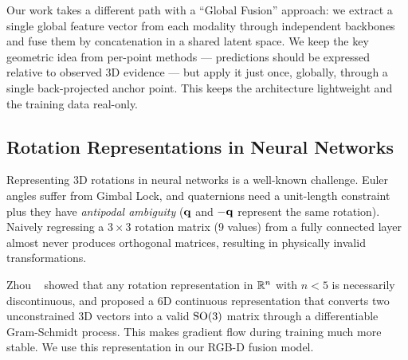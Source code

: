 Our work takes a different path with a ``Global Fusion'' approach: we extract a single global feature vector from each modality through independent backbones and fuse them by concatenation in a shared latent space. We keep the key geometric idea from per-point methods --- predictions should be expressed relative to observed 3D evidence --- but apply it just once, globally, through a single back-projected anchor point. This keeps the architecture lightweight and the training data real-only.

\subsection{Rotation Representations in Neural Networks}
\label{sec:related_rotation}

Representing 3D rotations in neural networks is a well-known challenge. Euler angles suffer from Gimbal Lock, and quaternions need a unit-length constraint plus they have \emph{antipodal ambiguity} ($\mathbf{q}$ and $-\mathbf{q}$ represent the same rotation). Naively regressing a $3\times 3$ rotation matrix (9 values) from a fully connected layer almost never produces orthogonal matrices, resulting in physically invalid transformations.

Zhou \etal~\cite{zhou2019continuity} showed that any rotation representation in $\mathbb{R}^n$ with $n < 5$ is necessarily discontinuous, and proposed a 6D continuous representation that converts two unconstrained 3D vectors into a valid $\mathrm{SO}(3)$ matrix through a differentiable Gram-Schmidt process. This makes gradient flow during training much more stable. We use this representation in our RGB-D fusion model.

